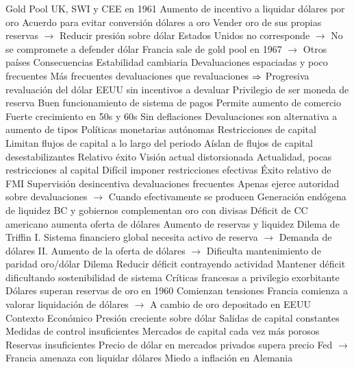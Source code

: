 \documentclass{nuevotema}
\begin{document}
\begin{esquemal}
				\4 Gold Pool
				\4[] UK, SWI y CEE en 1961
				\4[] Aumento de incentivo a liquidar dólares por oro
				\4[] Acuerdo para evitar conversión dólares a oro
				\4[] Vender oro de sus propias reservas
				\4[] $\to$ Reducir presión sobre dólar
				\4[] Estados Unidos no corresponde
				\4[] $\to$ No se compromete a defender dólar
				\4[] Francia sale de gold pool en 1967
				\4[] $\to$ Otros países
		\2 Consecuencias
			\3 Estabilidad cambiaria
				\4 Devaluaciones espaciadas y poco frecuentes
				\4 Más frecuentes devaluaciones que revaluaciones
				\4[] $\then$ Progresiva revaluación del dólar
				\4 EEUU sin incentivos a devaluar
				\4[] Privilegio de ser moneda de reserva
			\3 Buen funcionamiento de sistema de pagos
				\4 Permite aumento de comercio
				\4[$\to$] Fuerte crecimiento en 50s y 60s
			\3 Sin deflaciones
				\4 Devaluaciones son alternativa a aumento de tipos
				\4 Políticas monetarias autónomas
			\3 Restricciones de capital
				\4 Limitan flujos de capital a lo largo del periodo
				\4 Aíslan de flujos de capital desestabilizantes
				\4 Relativo éxito
				\4 Visión actual distorsionada
				\4[] Actualidad, pocas restricciones al capital
				\4[] Difícil imponer restricciones efectivas
			\3 Éxito relativo de FMI
				\4 Supervisión desincentiva devaluaciones frecuentes
				\4 Apenas ejerce autoridad sobre devaluaciones
				\4[] $\to$ Cuando efectivamente se producen
			\3 Generación endógena de liquidez
				\4 BC y gobiernos complementan oro con divisas
				\4 Déficit de CC americano aumenta oferta de dólares
				\4[$\then$] Aumento de reservas y liquidez
				\4 Dilema de Triffin
				\4[] I. Sistema financiero global necesita activo de reserva
				\4[] $\to$ Demanda de dólares
				\4[] II. Aumento de la oferta de dólares
				\4[] $\to$ Dificulta mantenimiento de paridad oro/dólar
				\4[$\then$] Dilema
				\4[] Reducir déficit contrayendo actividad
				\4[] Mantener déficit dificultando sostenibilidad de sistema
				\4 Críticas francesas a privilegio exorbitante
				\4 Dólares superan reservas de oro en 1960
				\4[] Comienzan tensiones
				\4[] Francia comienza a valorar liquidación de dólares
				\4[] $\to$ A cambio de oro depositado en EEUU
	\1 
		\2 Contexto
			\3 Económico
				\4 Presión creciente sobre dólar
				\4[] Salidas de capital constantes
				\4[] Medidas de control insuficientes
				\4[] Mercados de capital cada vez más porosos
				\4[] Reservas insuficientes
				\4[] Precio de dólar en mercados privados supera precio Fed
				\4[] $\to$ Francia amenaza con liquidar dólares
				\4 Miedo a inflación en Alemania

\end{esquemal}
\end{document}
